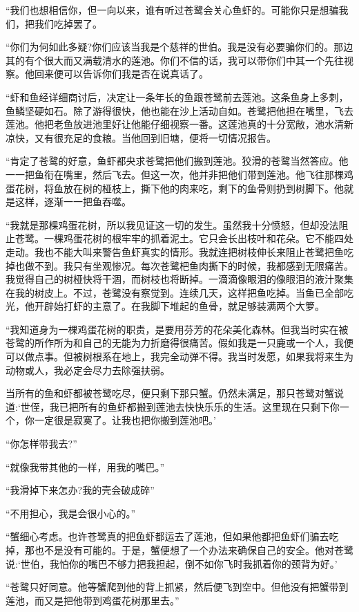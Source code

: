 \documentclass[12pt,twoside,openany]{book}
\begin{document}
“我们也想相信你，但一向以来，谁有听过苍鹭会关心鱼虾的。可能你只是想骗我们，把我们吃掉罢了。

“你们为何如此多疑?你们应该当我是个慈祥的世伯。我是没有必要骗你们的。那边其的有个很大而又满载清水的莲池。你们不信的话，我可以带你们中其一个先往视察。他回来便可以告诉你们我是否在说真话了。

“虾和鱼经详细商讨后，决定让一条年长的鱼跟苍鹭前去莲池。这条鱼身上多刺，鱼鳞坚硬如石。除了游得很快，他也能在沙上活动自如。苍鹭把他担在嘴里，飞去莲池。他把老鱼放进池里好让他能仔细视察一番。这莲池真的十分宽敞，池水清新凉快，又有很充足的食粮。当他回到旧塘，便将一切情况报告。

“肯定了苍鹭的好意，鱼虾都央求苍鹭把他们搬到莲池。狡滑的苍鹭当然答应。他一一把鱼衔在嘴里，然后飞去。但这一次，他并非把他们带到莲池。他飞往那棵鸡蛋花树，将鱼放在树的桠枝上，撕下他的肉来吃，剩下的鱼骨则扔到树脚下。他就是这样，逐渐一一把鱼吞噬。

“我就是那棵鸡蛋花树，所以我见证这一切的发生。虽然我十分愤怒，但却没法阻止苍鹭。一棵鸡蛋花树的根牢牢的抓着泥土。它只会长出枝叶和花朵。它不能四处走动。我也不能大叫来警告鱼虾真实的情形。我就连把树枝伸长来阻止苍鹭把鱼吃掉也做不到。我只有坐观惨况。每次苍鹭杷鱼肉撕下的时候，我都感到无限痛苦。我觉得自己的树桠快将干涸，而树枝也将断掉。一滴滴像眼泪的像眼泪的液汁聚集在我的树皮上。不过，苍鹭没有察觉到。连续几天，这样把鱼吃掉。当鱼已全部吃光，他开辟始打虾的主意了。在我脚下堆起的鱼骨，就足够装满两个大箩。

“我知道身为一棵鸡蛋花树的职责，是要用芬芳的花朵美化森林。但我当时实在被苍鹭的所作所为和自己的无能为力折磨得很痛苦。假如我是一只鹿或一个人，我便可以做点事。但被树根系在地上，我完全动弹不得。我当时发愿，如果我将来生为动物或人，我必定会尽力去除强扶弱。

当所有的鱼和虾都被苍鹭吃尽，便只剩下那只蟹。仍然未满足，那只苍鹭对蟹说道:‘世侄，我已把所有的鱼虾都搬到莲池去快快乐乐的生活。这里现在只剩下你一个，你一定很是寂寞了。让我也把你搬到莲池吧。’

“你怎样带我去?”

“就像我带其他的一样，用我的嘴巴。”

“我滑掉下来怎办?我的壳会破成碎”

“不用担心，我是会很小心的。”

“蟹细心考虑。也许苍鹭真的把鱼虾都运去了莲池，但如果他都把鱼虾们骗去吃掉，那也不是没有可能的。于是，蟹便想了一个办法来确保自己的安全。他对苍鹭说:‘世伯，我怕你的嘴巴不够力把我担起，倒不如你飞时我抓着你的颈背为好。’

“苍鹭只好同意。他等蟹爬到他的背上抓紧，然后便飞到空中。但他没有把蟹带到莲池，而又是把他带到鸡蛋花树那里去。”
\end{document}
